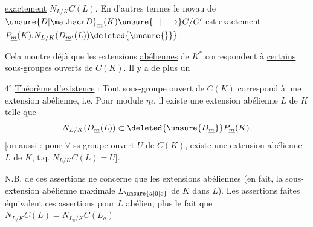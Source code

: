 \uline{exactement}    $N_{L/K}C(L)$. En d'autres termes le noyau de ${\unsure{D|\mathscr D}}_{\underline m}(K)\unsure{-|\longrightarrow}G/G'$ est \uline{exactement}  $P_{\underline m}(K).N_{L/K}(D_{\underline m'}(L))\deleted{\unsure{\}}}$.

Cela montre déjà que les extensions \uline{abéliennes}  de $K^*$ correspondent à  \uline{certains} sous-groupes ouverts de $C(K)$. Il y a de plus un

\textcircled{$4^\circ$} \uline{Théorème d'existence} :  Tout sous-groupe ouvert de $C(K)$ correspond à une extension abélienne, i.e. Pour  module $\underline m$, il existe une extension abélienne $L$ de $K$  telle que
\[
N_{L/K}(D_{\underline m}(L))\subset\deleted{\unsure{D_{\underline m}}}P_{\underline m}(K).
\]
[ou aussi : pour $\forall$ ss-groupe ouvert $U$ de $C(K)$, existe une extension abélienne $L$ de $K$, t.q. $N_{L/K}C(L)=U$].

N.B.  de ces assertions ne concerne que les extensions abéliennes  (en fait, la sous-extension abélienne maximale $L_{\unsure{a|0|o}}$ de $K$ dans $L$). Les assertions faites équivalent  ces assertions pour $L$ abélien, plus le fait que $N_{L/K}C(L)=N_{L_a/K}C(L_a)$

